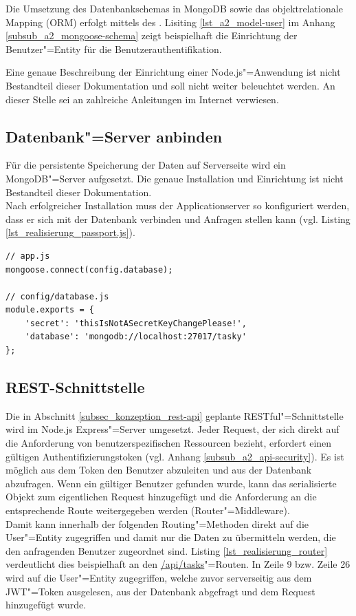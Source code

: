 Die Umsetzung des Datenbankschemas in MongoDB sowie das objektrelationale Mapping (ORM) erfolgt mittels des  . Lisiting \ref{lst_a2_model-user} im Anhang \ref{subsub_a2_mongoose-schema} zeigt beispielhaft die Einrichtung der Benutzer"=Entity für die Benutzerauthentifikation. 

Eine genaue Beschreibung der Einrichtung einer Node.js"=Anwendung ist nicht Bestandteil dieser Dokumentation und soll nicht weiter beleuchtet werden. An dieser Stelle sei an zahlreiche Anleitungen im Internet verwiesen.

\subsection{Datenbank"=Server anbinden}
\label{subsec_implementierung_datenbank}

Für die persistente Speicherung der Daten auf Serverseite wird ein MongoDB"=Server aufgesetzt. Die genaue Installation und Einrichtung ist nicht Bestandteil dieser Dokumentation. \\
Nach erfolgreicher Installation muss der Applicationserver so konfiguriert werden, dass er sich mit der Datenbank verbinden und Anfragen stellen kann (vgl. Listing \ref{lst_realisierung_passport.js}).

\begin{lstlisting}[caption={Verbindung zur Datenbank konfigurieren},label={lst_realisierung_passport.js}, frame=single]
// app.js 
mongoose.connect(config.database);

// config/database.js
module.exports = {
    'secret': 'thisIsNotASecretKeyChangePlease!',
    'database': 'mongodb://localhost:27017/tasky'
};
\end{lstlisting}


\subsection{REST-Schnittstelle}

Die in Abschnitt \ref{subsec_konzeption_rest-api} geplante RESTful"=Schnittstelle wird im Node.js Express"=Server umgesetzt. Jeder Request, der sich direkt auf die Anforderung von benutzerspezifischen Ressourcen bezieht, erfordert einen gültigen Authentifizierungstoken (vgl. Anhang \ref{subsub_a2_api-security}). Es ist möglich aus dem Token den Benutzer abzuleiten und aus der Datenbank abzufragen. Wenn ein gültiger Benutzer gefunden wurde, kann das serialisierte Objekt zum eigentlichen Request hinzugefügt und die Anforderung an die entsprechende Route weitergegeben werden (\glqq Router"=Middleware\grqq).\\
Damit kann innerhalb der folgenden Routing"=Methoden direkt auf die User"=Entity zugegriffen und damit nur die Daten zu übermitteln werden, die den anfragenden Benutzer zugeordnet sind. Listing \ref{lst_realisierung_router} verdeutlicht dies beispielhaft an den \url{/api/tasks}"=Routen. In Zeile 9 bzw. Zeile 26 wird auf die User"=Entity zugegriffen, welche zuvor serverseitig aus dem JWT"=Token ausgelesen, aus der Datenbank abgefragt und dem Request hinzugefügt wurde. \\


